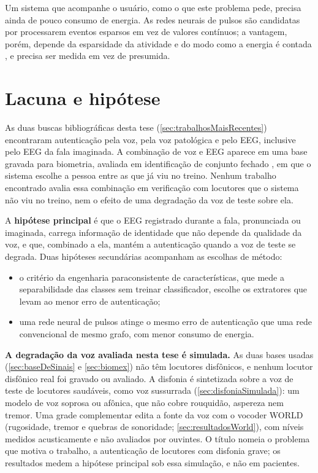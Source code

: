 		\par Um sistema que acompanhe o usuário, como o que este problema pede, precisa ainda de pouco consumo de energia. As redes neurais de pulsos são candidatas por processarem eventos esparsos em vez de valores contínuos; a vantagem, porém, depende da esparsidade da atividade e do modo como a energia é contada \cite{dampfhoffer2023snns}, e precisa ser medida em vez de presumida.

	\section{Lacuna e hipótese}

		\par As duas buscas bibliográficas desta tese (\autoref{sec:trabalhosMaisRecentes}) encontraram autenticação pela voz, pela voz patológica e pelo \ac{EEG}, inclusive pelo \ac{EEG} da fala imaginada. A combinação de voz e \ac{EEG} aparece em uma base gravada para biometria, avaliada em identificação de conjunto fechado \cite{morenorodriguez2021biomex}, em que o sistema escolhe a pessoa entre as que já viu no treino. Nenhum trabalho encontrado avalia essa combinação em verificação com locutores que o sistema não viu no treino, nem o efeito de uma degradação da voz de teste sobre ela.

		\par A \textbf{hipótese principal} é que o \ac{EEG} registrado durante a fala, pronunciada ou imaginada, carrega informação de identidade que não depende da qualidade da voz, e que, combinado a ela, mantém a autenticação quando a voz de teste se degrada. Duas hipóteses secundárias acompanham as escolhas de método:
		\begin{itemize}
			\item o critério da engenharia paraconsistente de características, que mede a separabilidade das classes sem treinar classificador, escolhe os extratores que levam ao menor erro de autenticação;
			\item uma rede neural de pulsos atinge o mesmo erro de autenticação que uma rede convencional de mesmo grafo, com menor consumo de energia.
		\end{itemize}

		\par \textbf{A degradação da voz avaliada nesta tese é simulada.} As duas bases usadas (\autoref{sec:baseDeSinais} e \autoref{sec:biomex}) não têm locutores disfônicos, e nenhum locutor disfônico real foi gravado ou avaliado. A disfonia é sintetizada sobre a voz de teste de locutores saudáveis, como voz sussurrada (\autoref{sec:disfoniaSimulada}): um modelo de voz soprosa ou afônica, que não cobre rouquidão, aspereza nem tremor. Uma grade complementar edita a fonte da voz com o vocoder WORLD (rugosidade, tremor e quebras de sonoridade; \autoref{sec:resultadosWorld}), com níveis medidos acusticamente e não avaliados por ouvintes. O título nomeia o problema que motiva o trabalho, a autenticação de locutores com disfonia grave; os resultados medem a hipótese principal sob essa simulação, e não em pacientes.

